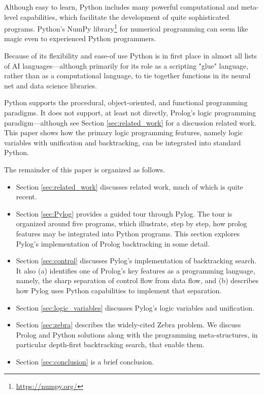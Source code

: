 Although easy to learn, Python includes many powerful computational and meta-level capabilities, which facilitate the development of quite sophisticated programs. Python's NumPy library\footnote{\url{https://numpy.org/}} for numerical programming can seem like magic even to experienced Python programmers. 

Because of its flexibility and ease-of use Python is in first place in almost all lists of AI languages---although primarily for its role as a scripting "glue" language, rather than as a computational language, to tie together functions in its neural net and data science libraries. 

Python supports the procedural, object-oriented, and functional programming paradigms. It does not support, at least not directly, Prolog's logic programming paradigm---although see Section \ref{sec:related_work} for a discussion related work. This paper shows how the primary logic programming features, namely logic variables with unification and backtracking, can be integrated into standard Python.

The remainder of this paper is organized as follows.
\begin{itemize}

 \item Section \ref{sec:related_work} discusses related work, much of which is quite recent.  

 \item Section \ref{sec:Pylog} provides a guided tour through Pylog. The tour is organized around five programs, which illustrate, step by step, how prolog features may be integrated into Python programs. This section explores Pylog's implementation of Prolog backtracking in some detail.

 \item Section \ref{sec:control} discusses Pylog's implementation of backtracking search. It also (a) identifies one of Prolog's key features as a programming language, namely, the sharp separation of control flow from data flow, and (b) describes how Pylog uses Python capabilities to implement that separation.

\item Section \ref{sec:logic_variables} discusses Pylog's logic variables and unification. 

 \item Section \ref{sec:zebra} describes the widely-cited Zebra problem. We discuss Prolog and Python solutions along with the programming meta-structures, in particular depth-first backtracking search, that enable them. 

 \item Section \ref{sec:conclusion} is a brief conclusion.  
\end{itemize} 

